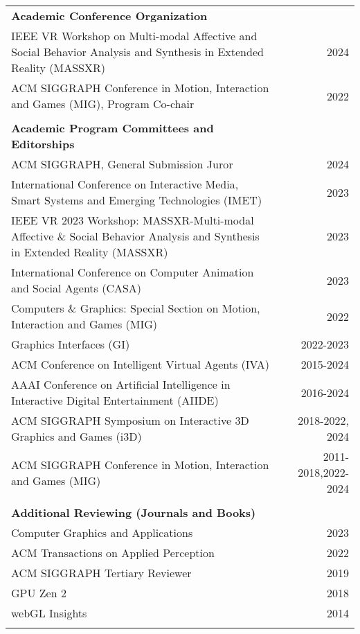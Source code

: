 \begin{table}[h!]
\begin{tabularx}{7.1in}{@{}L@{\extracolsep\fill}r}
{\bf Academic Conference Organization } & \\
IEEE VR Workshop on Multi-modal Affective and Social Behavior Analysis and Synthesis in Extended Reality (MASSXR) & 2024 \\
ACM SIGGRAPH Conference in Motion, Interaction and Games (MIG), Program Co-chair & 2022 \\
\phantom{yommomma} & \phantom{2002}\\

{\bf Academic Program Committees and Editorships} & \\
ACM SIGGRAPH, General Submission Juror & 2024\\
International Conference on Interactive Media, Smart Systems and Emerging Technologies (IMET)& 2023\\
IEEE VR 2023 Workshop: MASSXR-Multi-modal Affective \& Social Behavior Analysis and Synthesis in Extended Reality (MASSXR)& 2023\\
International Conference on Computer Animation and Social Agents (CASA)& 2023 \\
Computers \& Graphics: Special Section on Motion, Interaction and Games (MIG)& 2022 \\
Graphics Interfaces (GI)& 2022-2023 \\
ACM Conference on Intelligent Virtual Agents (IVA)& 2015-2024\\
AAAI Conference on Artificial Intelligence in Interactive Digital Entertainment (AIIDE)& 2016-2024 \\
ACM SIGGRAPH Symposium on Interactive 3D Graphics and Games (i3D)& 2018-2022, 2024 \\
ACM SIGGRAPH Conference in Motion, Interaction and Games (MIG)& 2011-2018,2022-2024 \\
\phantom{yommomma} & \phantom{2002}\\

{\bf Additional Reviewing (Journals and Books)} & \\
Computer Graphics and Applications & 2023 \\
ACM Transactions on Applied Perception & 2022 \\
ACM SIGGRAPH Tertiary Reviewer & 2019 \\
GPU Zen 2 & 2018 \\
webGL Insights & 2014 \\
\phantom{yommomma} & \phantom{2002}\\

\end{tabularx}
\end{table}


